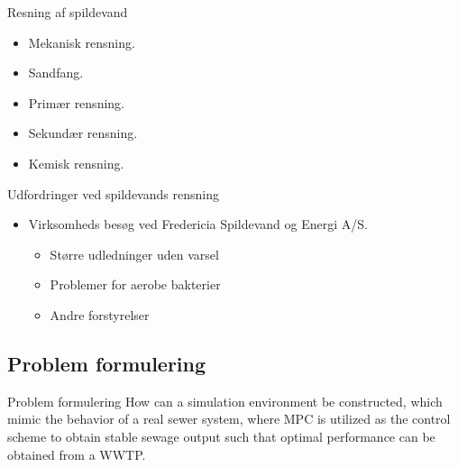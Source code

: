 \begin{frame}{Resning af spildevand}{}
\vfill\vfill\centering
\begin{itemize}
	\item<1-> Mekanisk rensning.
	\item<2-> Sandfang.
	\item<3-> Primær rensning.
	\item<4-> Sekundær rensning.
	\item<5-> Kemisk rensning.

\end{itemize}
\vfill\vfill
\end{frame}

\begin{frame}{Udfordringer ved spildevands rensning}{}
\vfill\vfill\centering
\begin{itemize}
	\item<1-> Virksomheds besøg ved Fredericia Spildevand og Energi A/S.
	
	\begin{itemize}
		\item<2-> Større udledninger uden varsel
		\item<3-> Problemer for aerobe bakterier
		\item<4-> Andre forstyrelser
	\end{itemize}	

\end{itemize}
\vfill\vfill
\end{frame}




\subsection{Problem formulering}

\begin{frame}{Problem formulering}{}
\vfill\vfill\centering
How can a simulation environment be constructed, which mimic the behavior of a real
sewer system, where MPC is utilized as the control scheme to obtain stable sewage output
such that optimal performance can be obtained from a WWTP.
\vfill\vfill
\end{frame}

